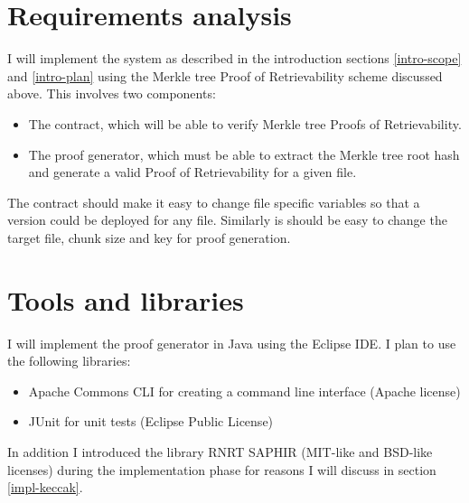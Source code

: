 \documentclass[12pt,a4paper,twoside,openright]{report}
\begin{document}





\section{Requirements analysis}

I will implement the system as described in the introduction sections \ref{intro-scope} and \ref{intro-plan} using the Merkle tree Proof of Retrievability scheme
discussed above. This involves two components:
\begin{itemize}
\item The contract, which will be able to verify Merkle tree Proofs of Retrievability.
\item The proof generator, which must be able to extract the Merkle tree root hash and generate a valid Proof of Retrievability for a given file.
\end{itemize}

The contract should make it easy to change file specific variables so that a version could be deployed for any file.
Similarly is should be easy to change the target file, chunk size and key for proof generation.


\section{Tools and libraries}

I will implement the proof generator in Java using the Eclipse IDE.
I plan to use the following libraries:
\begin{itemize}
\item Apache Commons CLI for creating a command line interface (Apache license)
\item JUnit for unit tests (Eclipse Public License)
\end{itemize}
In addition I introduced the library RNRT SAPHIR (MIT-like and BSD-like licenses) during the implementation phase
for reasons I will discuss in section \ref{impl-keccak}.
\end{document}
